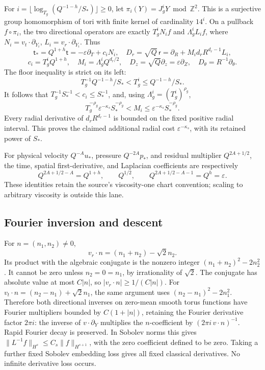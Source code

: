 \documentclass[10pt,a4paper]{article}
\begin{document}
For \(i=\lfloor\log_{T_g}(Q^{-1-h}/S_*)\rfloor\ge0\), let \(\pi_i(Y)=J_g^iY\bmod\mathbb Z^2\). This is a surjective group homomorphism of tori with finite kernel of cardinality \(14^i\). On a pullback \(f\circ\pi_i\), the two directional operators are exactly \(T_g^iN_if\) and \(\Lambda_g^iL_if\), where \(N_i=v_t\cdot\partial_{Y_i}\), \(L_i=v_r\cdot\partial_{Y_i}\). Thus \[
\mathsf t_*=Q^{1+h}\mathsf t=-\varepsilon\partial_T+c_iN_i,
\quad D_r=\sqrt Q\,\mathsf r=\partial_R+M_id_rR^{d_r-1}L_i,
\] \[
c_i=T_g^iQ^{1+h},\quad M_i=\Lambda_g^iQ^{d_r/2},\quad
D_z=\sqrt Q\partial_z=\varepsilon\partial_Z,
\quad D_\theta=R^{-1}\partial_\theta.
\] The floor inequality is strict on its left: \[
T_g^{-1}Q^{-1-h}/S_*<T_g^i\le Q^{-1-h}/S_*.
\] It follows that \(T_g^{-1}S_*^{-1}<c_i\le S_*^{-1}\), and, using \(\Lambda_g^i=(T_g^i)^{\rho_g}\), \[
T_g^{-\rho_g}\varepsilon^{-\kappa_s}S_*^{-\rho_g}
<M_i\le\varepsilon^{-\kappa_s}S_*^{-\rho_g}.
\] Every radial derivative of \(d_rR^{d_r-1}\) is bounded on the fixed positive radial interval. This proves the claimed additional radial cost \(\varepsilon^{-\kappa_s}\), with its retained power of \(S_*\).

For physical velocity \(Q^{-A}u_*\), pressure \(Q^{-2A}p_*\), and residual multiplier \(Q^{2A+1/2}\), the time, spatial first-derivative, and Laplacian coefficients are respectively \[
Q^{2A+1/2-A}=Q^{1+h},\qquad
Q^{1/2},\qquad
Q^{2A+1/2-A-1}=Q^h=\varepsilon.
\] These identities retain the source's viscosity-one chart convention; scaling to arbitrary viscosity is outside this lane.

\subsection{Fourier inversion and descent}\label{fourier-inversion-and-descent}

For \(n=(n_1,n_2)\ne0\), \[
v_r\cdot n=(n_1+n_2)-\sqrt2n_2.
\] Its product with the algebraic conjugate is the nonzero integer \((n_1+n_2)^2-2n_2^2\). It cannot be zero unless \(n_2=0=n_1\), by irrationality of \(\sqrt2\). The conjugate has absolute value at most \(C|n|\), so \(|v_r\cdot n|\ge1/(C|n|)\). For \(v_t\cdot n=(n_2-n_1)+\sqrt2n_1\), the same argument uses \((n_2-n_1)^2-2n_1^2\). Therefore both directional inverses on zero-mean smooth torus functions have Fourier multipliers bounded by \(C(1+|n|)\), retaining the Fourier derivative factor \(2\pi i\): the inverse of \(v\cdot\partial_Y\) multiplies the \(n\)-coefficient by \((2\pi i\,v\cdot n)^{-1}\). Rapid Fourier decay is preserved. In Sobolev norms this gives \(\|L^{-1}f\|_{H^s}\le C_s\|f\|_{H^{s+1}}\), with the zero coefficient defined to be zero. Taking a further fixed Sobolev embedding loss gives all fixed classical derivatives. No infinite derivative loss occurs.
\end{document}
